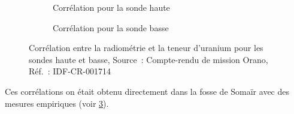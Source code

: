 \begin{figure}
    \centering
    \begin{subfigure}{0.45\textwidth}
        \centering
        \caption{Corrélation pour la sonde haute}
        \label{fig:correlation_sonde_haute}
    \end{subfigure}
    \begin{subfigure}{0.45\textwidth}
        \centering
        \caption{Corrélation pour la sonde basse}
        \label{fig:correlation_sonde_basse}
    \end{subfigure}
    \caption{Corrélation entre la radiométrie et la teneur d'uranium pour les sondes haute et basse, Source~: Compte-rendu de mission Orano, Réf.~: IDF-CR-001714}
    \label{fig:correlation_sonde}
\end{figure}
Ces corrélations on était obtenu directement dans la fosse de Somaïr avec des mesures empiriques (voir \cref{fig:correlation_sonde}).

